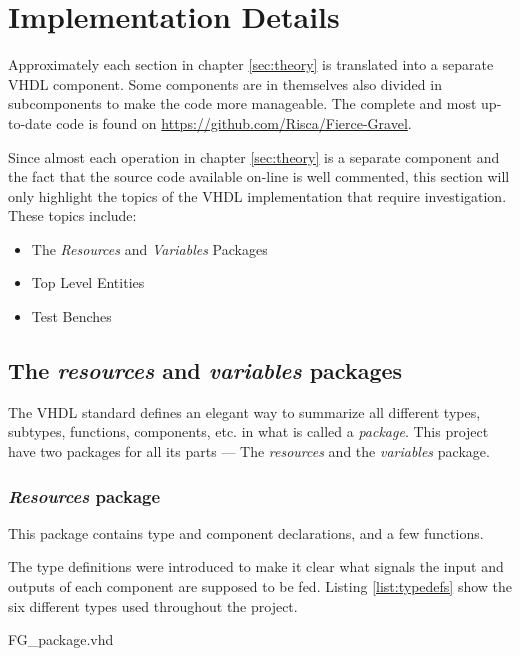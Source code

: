 \documentclass[report.tex]{subfiles}
\begin{document}
\chapter{Implementation Details}
\label{chap:implementation details}
Approximately each section in chapter \ref{sec:theory} is translated into a separate VHDL component. Some components are in themselves also divided in subcomponents to make the code more manageable. The complete and most up-to-date code is found on \url{https://github.com/Risca/Fierce-Gravel}.

Since almost each operation in chapter \ref{sec:theory} is a separate component and the fact that the source code available on-line is well commented, this section will only highlight the topics of the VHDL implementation that require investigation. These topics include:

\begin{itemize}
\item The \emph{Resources} and \emph{Variables} Packages
\item Top Level Entities
\item Test Benches
\end{itemize}

\section{The \emph{resources} and \emph{variables} packages}
The VHDL standard defines an elegant way to summarize all different types, subtypes, functions, components, etc. in what is called a \emph{package}. This project have two packages for all its parts --- The \emph{resources} and the \emph{variables} package.

\subsection{\emph{Resources} package}
This package contains type and component declarations, and a few functions.

The type definitions were introduced to make it clear what signals the input and outputs of each component are supposed to be fed.
Listing \ref{list:typedefs} show the six different types used throughout the project.


{FG_package.vhd}
\end{document}

